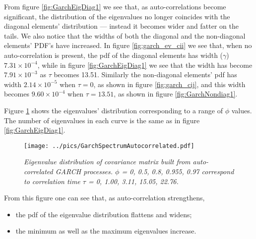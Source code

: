 \documentclass{report}
\begin{document}
From figure \ref{fig:GarchEigDiag1} we see that, as auto-correlations
become significant, the distribution of the eigenvalues no longer
coincides with the diagonal elements' distribution --- instead it
becomes wider and fatter on the tails. We also notice that the widths
of both the diagonal and the non-diagonal elements' PDF's have
increased.  In figure \ref{fig:garch_ev_cii} we see that, when no
auto-correlation is present, the \gls{pdf} of the diagonal elements has
width ($\gamma$) $7.31 \times 10^{-4}$, while in figure
\ref{fig:GarchEigDiag1} we see that the width has become $7.91 \times
10^{-3}$ as $\tau$ becomes 13.51. Similarly the non-diagonal elements'
\gls{pdf} has width $2.14 \times 10^{-5}$ when $\tau=0$, as shown in figure
\ref{fig:garch_cij}, and this width becomes $9.60 \times 10^{-4}$ when
$\tau = 13.51$, as shown in figure \ref{fig:GarchNondiag1}.

Figure \ref{fig:GarchSpectrumAutocorrelated} shows the eigenvalues'
distribution corresponding to a range of $\phi$ values. The number of
eigenvalues in each curve is the same as in figure
\ref{fig:GarchEigDiag1}.
\begin{figure}[htb!]
  \centering
  \texttt{[image: ../pics/GarchSpectrumAutocorrelated.pdf]}
  \caption{\small \it Eigenvalue distribution of covariance
    matrix built from auto-correlated GARCH processes. $\phi$ = 0,
    0.5, 0.8, 0.955, 0.97 correspond to correlation time $\tau$ =
    0, 1.00, 3.11, 15.05, 22.76.}
  \label{fig:GarchSpectrumAutocorrelated}
\end{figure}
From this figure one can see that, as auto-correlation strengthens,
\begin{itemize}
\item the \gls{pdf} of the eigenvalue distribution flattens and widens;
\item the minimum as well as the maximum eigenvalues increase.
\end{itemize}
\end{document}
